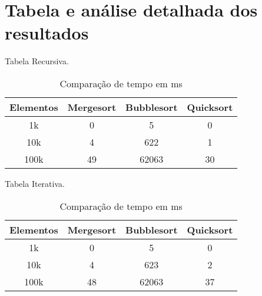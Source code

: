 \section{Tabela e análise detalhada dos resultados}
Tabela Recursiva. \\

\begin{table}[ht!]
    \centering
    \begin{tabular}{|c|c|c|c|}
    \hline
    \textbf{Elementos} &\textbf{Mergesort} & \textbf{Bubblesort} & \textbf{Quicksort} \\ \hline
     1k & 0 & 5 & 0  \\ \hline
     10k & 4 & 622 & 1  \\ \hline
     100k & 49 & 62063 & 30  \\ \hline
    \end{tabular}  
    \caption{Comparação de tempo em ms}
\end{table}

Tabela Iterativa. \\

\begin{table}[ht!]
    \centering
    \begin{tabular}{|c|c|c|c|}
    \hline
    \textbf{Elementos} &\textbf{Mergesort} & \textbf{Bubblesort} & \textbf{Quicksort} \\ \hline
     1k & 0 & 5 & 0  \\ \hline
     10k & 4 & 623 & 2  \\ \hline
     100k & 48 & 62063 & 37  \\ \hline
    \end{tabular}  
    \caption{Comparação de tempo em ms}
\end{table}